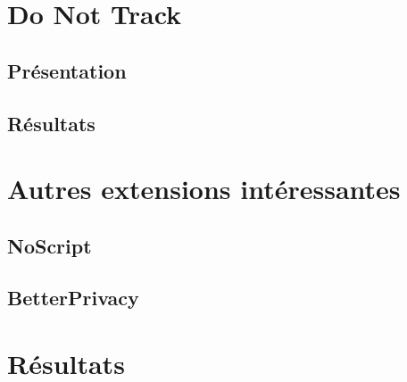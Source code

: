 \section{Do Not Track}
\subsection{Présentation}
\subsection{Résultats}

\section{Autres extensions intéressantes}
\subsection{NoScript}
\subsection{BetterPrivacy}


\section{Résultats}
\label{results_plugins}

